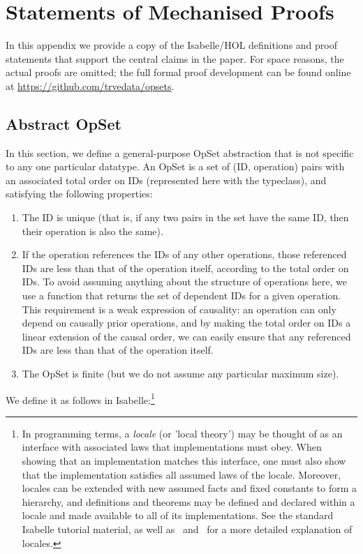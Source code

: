 \section{Statements of Mechanised Proofs}
\label{sect:appendix:statements}

In this appendix we provide a copy of the Isabelle/HOL definitions and proof statements that support the central claims in the paper.
For space reasons, the actual proofs are omitted; the full formal proof development can be found online at \url{https://github.com/trvedata/opsets}.

\subsection{Abstract OpSet}\label{sec:abstract-opset}

In this section, we define a general-purpose OpSet abstraction that is not specific to any one particular datatype.
An OpSet is a set of (ID, operation) pairs with an associated total order on IDs (represented here with the  typeclass), and satisfying the following properties:
\begin{enumerate}
\item The ID is unique (that is, if any two pairs in the set have the same ID, then their operation is also the same).
\item If the operation references the IDs of any other operations, those referenced IDs are less than that of the operation itself, according to the total order on IDs.
To avoid assuming anything about the structure of operations here, we use a function  that returns the set of dependent IDs for a given operation.
This requirement is a weak expression of causality: an operation can only depend on causally prior operations, and by making the total order on IDs a linear extension of the causal order, we can easily ensure that any referenced IDs are less than that of the operation itself.
\item The OpSet is finite (but we do not assume any particular maximum size).
\end{enumerate}
We define it as follows in Isabelle:\footnote{In programming terms, a \emph{locale} (or 'local theory') may be thought of as an interface with associated laws that implementations must obey.
When showing that an implementation matches this interface, one must also show that the implementation satisfies all assumed laws of the locale.
Moreover, locales can be extended with new assumed facts and fixed constants to form a hierarchy, and definitions and theorems may be defined and declared within a locale and made available to all of its implementations.
See the standard Isabelle tutorial material, as well as~\cite{DBLP:conf/tphol/KammullerWP99} and~\cite{DBLP:conf/types/HaftmannW08} for a more detailed explanation of locales.}
